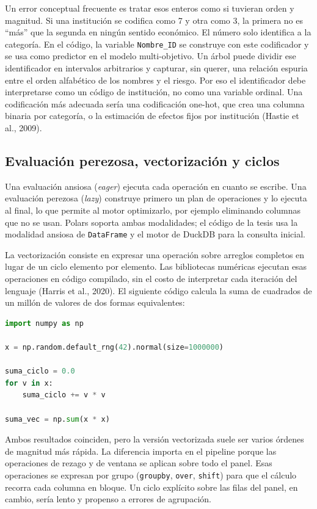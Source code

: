 Un error conceptual frecuente es tratar esos enteros como si tuvieran orden y magnitud. Si una institución se codifica como 7 y otra como 3, la primera no es ``más'' que la segunda en ningún sentido económico. El número solo identifica a la categoría. En el código, la variable \texttt{Nombre\_ID} se construye con este codificador y se usa como predictor en el modelo multi-objetivo. Un árbol puede dividir ese identificador en intervalos arbitrarios y capturar, sin querer, una relación espuria entre el orden alfabético de los nombres y el riesgo. Por eso el identificador debe interpretarse como un código de institución, no como una variable ordinal. Una codificación más adecuada sería una codificación one-hot, que crea una columna binaria por categoría, o la estimación de efectos fijos por institución (Hastie et al., 2009).

\subsection{Evaluación perezosa, vectorización y ciclos}
Una evaluación ansiosa (\textit{eager}) ejecuta cada operación en cuanto se escribe. Una evaluación perezosa (\textit{lazy}) construye primero un plan de operaciones y lo ejecuta al final, lo que permite al motor optimizarlo, por ejemplo eliminando columnas que no se usan. Polars soporta ambas modalidades; el código de la tesis usa la modalidad ansiosa de \texttt{DataFrame} y el motor de DuckDB para la consulta inicial.

La vectorización consiste en expresar una operación sobre arreglos completos en lugar de un ciclo elemento por elemento. Las bibliotecas numéricas ejecutan esas operaciones en código compilado, sin el costo de interpretar cada iteración del lenguaje (Harris et al., 2020). El siguiente código calcula la suma de cuadrados de un millón de valores de dos formas equivalentes:

\begin{lstlisting}[language=Python, caption={Suma de cuadrados con ciclo explícito y con operación vectorizada}, label={lst:vectorizacion}]
import numpy as np

x = np.random.default_rng(42).normal(size=1000000)

suma_ciclo = 0.0
for v in x:
    suma_ciclo += v * v

suma_vec = np.sum(x * x)
\end{lstlisting}

Ambos resultados coinciden, pero la versión vectorizada suele ser varios órdenes de magnitud más rápida. La diferencia importa en el pipeline porque las operaciones de rezago y de ventana se aplican sobre todo el panel. Esas operaciones se expresan por grupo (\texttt{groupby}, \texttt{over}, \texttt{shift}) para que el cálculo recorra cada columna en bloque. Un ciclo explícito sobre las filas del panel, en cambio, sería lento y propenso a errores de agrupación.

